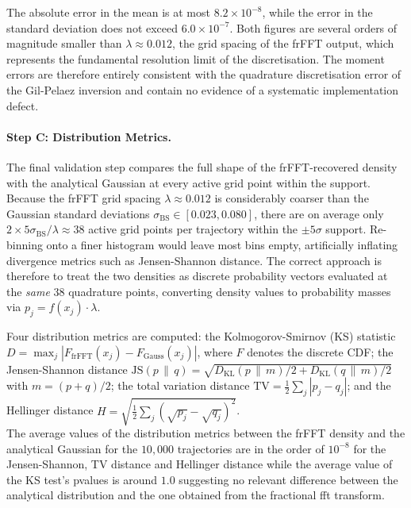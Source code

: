 The absolute error in the mean is at most $8.2 \times 10^{-8}$, while the
error in the standard deviation does not exceed $6.0 \times 10^{-7}$.  Both
figures are several orders of magnitude smaller than $\lambda \approx 0.012$,
the grid spacing of the frFFT output, which represents the fundamental
resolution limit of the discretisation.  The moment errors are therefore
entirely consistent with the quadrature discretisation error of the
Gil-Pelaez inversion and contain no evidence of a systematic implementation
defect.

\paragraph{Step C: Distribution Metrics.}
\label{subsec:step_c}

The final validation step compares the full shape of the frFFT-recovered
density with the analytical Gaussian at every active grid point within the
support.  Because the frFFT grid spacing $\lambda \approx 0.012$ is
considerably coarser than the Gaussian standard deviations
$\sigma_{\mathrm{BS}} \in [0.023, 0.080]$, there are on average only
$2 \times 5\sigma_{\mathrm{BS}} / \lambda \approx 38$ active grid points per
trajectory within the $\pm 5\sigma$ support.  Re-binning onto a finer histogram
would leave most bins empty, artificially inflating divergence metrics such as
Jensen-Shannon distance.  The correct approach is therefore to treat the two
densities as discrete probability vectors evaluated at the \emph{same}
$38$ quadrature points, converting density values to probability masses via
$p_j = f(x_j) \cdot \lambda$.

Four distribution metrics are computed: the Kolmogorov-Smirnov (KS)
statistic $D = \max_j |F_{\mathrm{frFFT}}(x_j) - F_{\mathrm{Gauss}}(x_j)|$,
where $F$ denotes the discrete CDF; the Jensen-Shannon distance
$\mathrm{JS}(p \,\|\, q) = \sqrt{D_{\mathrm{KL}}(p \,\|\, m) / 2
+ D_{\mathrm{KL}}(q \,\|\, m)/2}$ with $m = (p+q)/2$; the total variation
distance $\mathrm{TV} = \tfrac{1}{2}\sum_j |p_j - q_j|$; and the
Hellinger distance $H = \sqrt{\tfrac{1}{2}\sum_j (\sqrt{p_j} - \sqrt{q_j})^2}$.\\
The average values of the distribution metrics between the frFFT density and the
analytical Gaussian for the $10,000$ trajectories are in the order of $10^{-8}$ for the Jensen-Shannon, TV distance and Hellinger distance
while the average value of the KS test's pvalues is around $1.0$ suggesting no relevant difference between the 
analytical distribution and the one obtained from the fractional fft transform.\\


